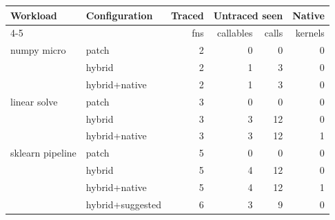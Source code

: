 \begin{tabular}{llrrrr}
\toprule
Workload & Configuration & Traced & \multicolumn{2}{c}{Untraced seen} & Native \\
\cmidrule(lr){4-5}
 & & fns & callables & calls & kernels \\
\midrule
numpy micro & patch & 2 & 0 & 0 & 0 \\
 & hybrid & 2 & 1 & 3 & 0 \\
 & hybrid+native & 2 & 1 & 3 & 0 \\
linear solve & patch & 3 & 0 & 0 & 0 \\
 & hybrid & 3 & 3 & 12 & 0 \\
 & hybrid+native & 3 & 3 & 12 & 1 \\
sklearn pipeline & patch & 5 & 0 & 0 & 0 \\
 & hybrid & 5 & 4 & 12 & 0 \\
 & hybrid+native & 5 & 4 & 12 & 1 \\
 & hybrid+suggested & 6 & 3 & 9 & 0 \\
\bottomrule
\end{tabular}
